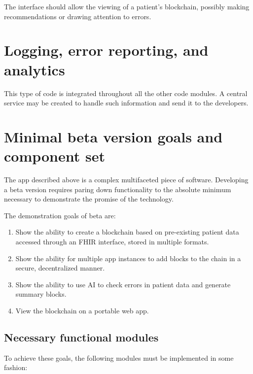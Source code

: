 \documentclass[12pt]{article}
\begin{document}
The interface should allow the viewing of a patient's blockchain, possibly making recommendations or drawing attention to errors.

\section{Logging, error reporting, and analytics}

This type of code is integrated throughout all the other code modules. A central service may be created to handle such information and send it to the developers.


\section{Minimal beta version goals and component set}

The app described above is a complex multifaceted piece of software. Developing a beta version requires paring down functionality to the absolute minimum necessary to demonstrate the promise of the technology.

The demonstration goals of beta are:
\begin{enumerate}
\item Show the ability to create a blockchain based on pre-existing patient data accessed through an FHIR interface, stored in multiple formats.

\item Show the ability for multiple app instances to add blocks to the chain in a secure, decentralized manner.

\item Show the ability to use AI to check errors in patient data and generate summary blocks.

\item View the blockchain on a portable web app.
\end{enumerate}


\subsection{Necessary functional modules}
To achieve these goals, the following modules must be implemented in some fashion:
\end{document}
